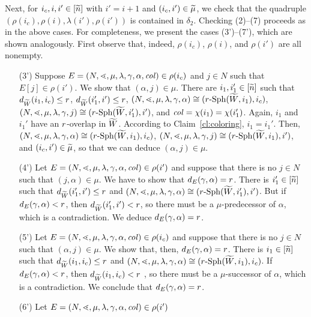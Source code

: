 \documentclass{LMCS}
\begin{document}
\noindent Next, for $i_c,i,i' \in [\widetilde{n}]$ with $i' = i + 1$ and
$(i_c,i') \in \widetilde{\mu}$, we check that the quadruple
$(\rho(i_c),\rho(i),\lambda(i'),\rho(i'))$ is contained in
$\delta_2$. Checking (2)--(7) proceeds as in the above cases. For
completeness, we present the cases (3')--(7'), which are shown
analogously.  First observe that, indeed, $\rho(i_c)$, $\rho(i)$, and
$\rho(i')$ are all nonempty.
\begin{enumerate}[(1')]
\item[(3')] Suppose $E=(N,\mathord{\lessdot},\mu,\lambda,\gamma,\alpha,\mathit{col}) \in
  \rho(i_c)$ and $j \in N$ such that $E[j] \in \rho(i')$. We show that
  $(\alpha,j) \in \mu$. There are $i_1,i_1' \in [\widetilde{n}]$ such that
  $d_{\widetilde{W}}(i_1,i_c) \le r$, $d_{\widetilde{W}}(i_1',i') \le r$,
  $(N,\mathord{\lessdot},\mu,\lambda,\gamma,\alpha) \cong
  (r\text{-}\mathrm{Sph}({\widetilde{W}},i_1),i_c)$, $(N,\mathord{\lessdot},\mu,\lambda,\gamma,j) \cong
  (r\text{-}\mathrm{Sph}({\widetilde{W}},i_1'),i')$, and $\mathit{col} = \chi(i_1) = \chi(i_1')$. Again,
  $i_1$ and $i_1'$ have an $r$-overlap in ${\widetilde{W}}$. According to
  Claim~\ref{cl:coloring}, $i_1 = i_1'$. Then,
  $(N,\mathord{\lessdot},\mu,\lambda,\gamma,\alpha) \cong
  (r\text{-}\mathrm{Sph}({\widetilde{W}},i_1),i_c)$, $(N,\mathord{\lessdot},\mu,\lambda,\gamma,j) \cong
  (r\text{-}\mathrm{Sph}({\widetilde{W}},i_1),i')$, and $(i_c,i') \in \widetilde{\mu}$, so that we can
  deduce $(\alpha,j) \in \mu$.
\item[(4')] Let $E=(N,\mathord{\lessdot},\mu,\lambda,\gamma,\alpha,\mathit{col}) \in \rho(i')$
  and suppose that there is no $j \in N$ such that $(j,\alpha) \in \mu$. We
  have to show that $d_E(\gamma,\alpha)=r$. There is $i_1' \in [\widetilde{n}]$
  such that $d_{\widetilde{W}}(i_1',i') \le r$ and
  $(N,\mathord{\lessdot},\mu,\lambda,\gamma,\alpha) \cong
  (r\text{-}\mathrm{Sph}({\widetilde{W}},i_1'),i')$. But if $d_E(\gamma,\alpha) < r$, then
  $d_{\widetilde{W}}(i_1',i') < r$, so there must be a $\mu$-predecessor of
  $\alpha$, which is a contradiction. We deduce $d_E(\gamma,\alpha)=r$.
\item[(5')] Let $E=(N,\mathord{\lessdot},\mu,\lambda,\gamma,\alpha,\mathit{col}) \in \rho(i_c)$
  and suppose that there is no $j \in N$ such that $(\alpha,j) \in \mu$. We
  show that, then, $d_E(\gamma,\alpha)=r$. There is $i_1 \in [\widetilde{n}]$ such
  that $d_{\widetilde{W}}(i_1,i_c) \le r$ and
  $(N,\mathord{\lessdot},\mu,\lambda,\gamma,\alpha) \cong
  (r\text{-}\mathrm{Sph}({\widetilde{W}},i_1),i_c)$. If $d_E(\gamma,\alpha) < r$, then
  $d_{\widetilde{W}}(i_1,i_c) < r$ , so there must be a $\mu$-successor of $\alpha$,
  which is a contradiction. We conclude that $d_E(\gamma,\alpha)=r$.
\item[(6')] Let $E=(N,\mathord{\lessdot},\mu,\lambda,\gamma,\alpha,\mathit{col}) \in \rho(i')$

\end{enumerate}
\end{document}
